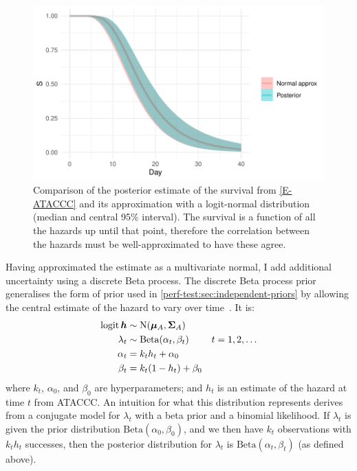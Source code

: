 \documentclass[thesis.tex]{subfiles}
\begin{document}
\begin{figure}
  \centering \includegraphics{cis-perfect-testing/ataccc-approximation-survival}
  \caption[Approximating the ATACCC posterior survival as a logit-normal]{Comparison of the posterior estimate of the survival from \cref{E-ATACCC} and its approximation with a logit-normal distribution (median and central 95\% interval). The survival is a function of all the hazards up until that point, therefore the correlation between the hazards must be well-approximated to have these agree. \label{perf-test:fig:approximate-ATACCC-survival}}
\end{figure}

Having approximated the estimate as a multivariate normal, I add additional uncertainty using a discrete Beta process.
The discrete Beta process prior generalises the form of prior used in \cref{perf-test:sec:independent-priors} by allowing the central estimate of the hazard to vary over time~\autocite{ibrahimBayesian,sunStatisticala}.
It is:
\begin{align}
  \operatorname{logit} \bm{h} &\sim \operatorname{N}(\bm{\mu}_A, \bm{\Sigma}_A) \\
  \lambda_t &\sim \text{Beta}(\alpha_t, \beta_t) &t = 1, 2, \dots \\
  \alpha_t &= k_t h_t + \alpha_0 \\
  \beta_t &= k_t (1 - h_t) + \beta_0
\end{align}
where $k_t$, $\alpha_0$, and $\beta_0$ are hyperparameters; and $h_t$ is an estimate of the hazard at time $t$ from ATACCC.
An intuition for what this distribution represents derives from a conjugate model for $\lambda_t$ with a beta prior and a binomial likelihood.
If $\lambda_t$ is given the prior distribution $\text{Beta}(\alpha_0, \beta_0)$, and we then have $k_t$ observations with $k_t h_t$ successes, then the posterior distribution for $\lambda_t$ is $\text{Beta}(\alpha_t, \beta_t)$ (as defined above).
\end{document}
